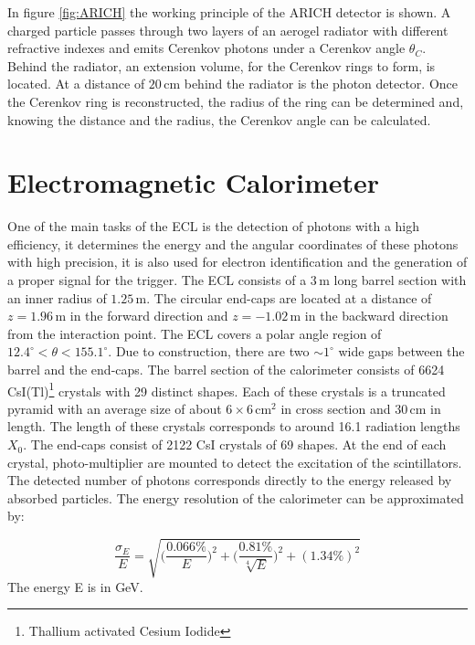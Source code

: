 \documentclass[a4paper,11pt,twosided,final,german,openbib,pdftex,listof=totoc,bibliography=totoc]{scrbook}
\begin{document}
In figure \ref{fig:ARICH} the working principle of the ARICH detector is shown. A charged particle passes through two layers of an aerogel radiator with different refractive indexes and emits Cerenkov photons under a Cerenkov angle $\theta_C$. Behind the radiator, an extension volume, for the Cerenkov rings to form, is located. At a distance of $20\,\textrm{cm}$ behind the radiator is the photon detector.\cite{B2TR} Once the Cerenkov ring is reconstructed, the radius of the ring can be determined and, knowing the distance and the radius, the Cerenkov angle can be calculated.

\section{Electromagnetic Calorimeter}
\label{sec:ECL}

One of the main tasks of the ECL is the detection of photons with a high efficiency, it determines the energy and the angular coordinates of these photons with high precision, it is also used for electron identification and the generation of a proper signal for the trigger. The ECL consists of a $3\,\textrm{m}$ long barrel section with an inner radius of $1.25\,\textrm{m}$. The circular end-caps are located at a distance of $z=1.96\,\textrm{m}$ in the forward direction and $z=-1.02\,\textrm{m}$ in the backward direction from the interaction point. The ECL covers a polar angle region of $12.4^{\circ} < \theta < 155.1^{\circ}$. Due to construction, there are two $ \sim 1^{\circ}$ wide gaps between the barrel and the end-caps. The barrel section of the calorimeter consists of 6624 CsI(Tl)\footnote{Thallium activated Cesium Iodide} crystals with 29 distinct shapes. Each of these crystals is a truncated pyramid with an average size of about $6\times6 \, \textrm{cm}^2$ in cross section and $30\,\textrm{cm}$ in length. The length of these crystals corresponds to around 16.1 radiation lengths $X_0$. The end-caps consist of 2122 CsI crystals of 69 shapes. At the end of each crystal, photo-multiplier are mounted to detect the excitation of the scintillators. The detected number of photons corresponds directly to the energy released by absorbed particles.
The energy resolution of the calorimeter can be approximated by:\cite{B2TR} \cite{Belle_ECL_2015}

\begin{equation}
\frac{\sigma_E}{E} = \sqrt{\bigg(\frac{0.066\%}{E}\bigg)^2 + \bigg(\frac{0.81\%}{\sqrt[4]{E}}\bigg)^2 + (1.34\%)^2}
\end{equation}
The energy E is in GeV.
\newline
\end{document}
